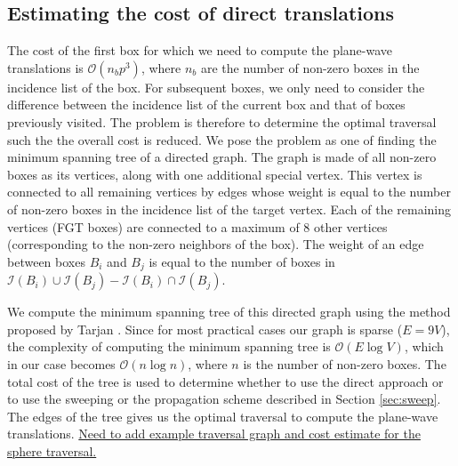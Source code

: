 \subsection{Estimating the cost of direct translations}
\label{sec:mst}
The cost of the first box for which we need to compute the plane-wave translations is $\mathcal{O}(n_bp^3)$, where $n_b$ are the number of non-zero boxes in the incidence list of the box. For subsequent boxes, we only need to consider the difference between the incidence list of the current box and that of boxes previously visited. The problem is therefore to determine the optimal traversal such the the overall cost is reduced. We pose the problem as one of finding the minimum spanning tree of a directed graph. The graph is made of all non-zero boxes as its vertices, along with one additional special vertex. This vertex is connected to all remaining vertices by edges whose weight is equal to the number of non-zero boxes in the incidence list of the target vertex. Each of the remaining vertices (FGT boxes) are connected to a maximum of 8 other vertices (corresponding to the non-zero neighbors of the box). The weight of an edge between boxes $B_i$ and $B_j$ is equal to the number of boxes in $\mathcal{I}(B_i)\cup\mathcal{I}(B_j) - \mathcal{I}(B_i)\cap\mathcal{I}(B_j)$.    

We compute the minimum spanning tree of this directed graph using the method proposed by Tarjan \cite{tarjan86}. Since for most practical cases our graph is sparse ($E=9V$), the complexity of computing the minimum spanning tree is $\mathcal{O}(E\log V)$, which in our case becomes $\mathcal{O}(n\log n)$, where $n$ is the number of non-zero boxes. The total cost of the tree is used to determine whether to use the direct approach or to use the sweeping or the propagation scheme described in Section \ref{sec:sweep}. The edges of the tree gives us the optimal traversal to compute the plane-wave translations. \ul{Need to add example traversal graph and cost estimate for the sphere traversal.}
